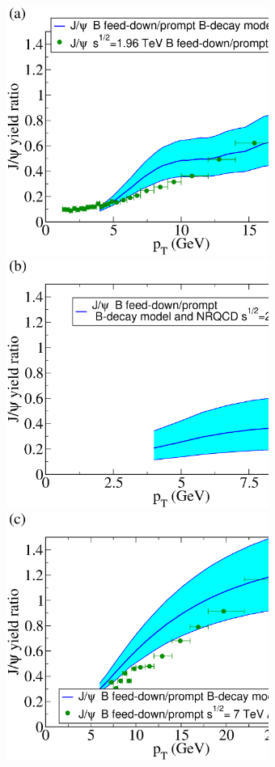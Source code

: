 \documentclass[article,showpacs,preprintnumbers,amsmath,amssymb]{revtex4}
\begin{document}
\begin{appendix}
\begin{figure}[!ht]
\vspace*{.2in} 
\includegraphics[width=3.38in,angle=0]{fig27_cdf1960ppRatio.eps} 
\includegraphics[width=3.38in,angle=0]{fig28_rhic0200ppRatio.eps} 
\includegraphics[width=3.38in,angle=0]{fig29_lhc7000ppRatio.eps} 

\end{figure}
\end{appendix}
\end{document}
